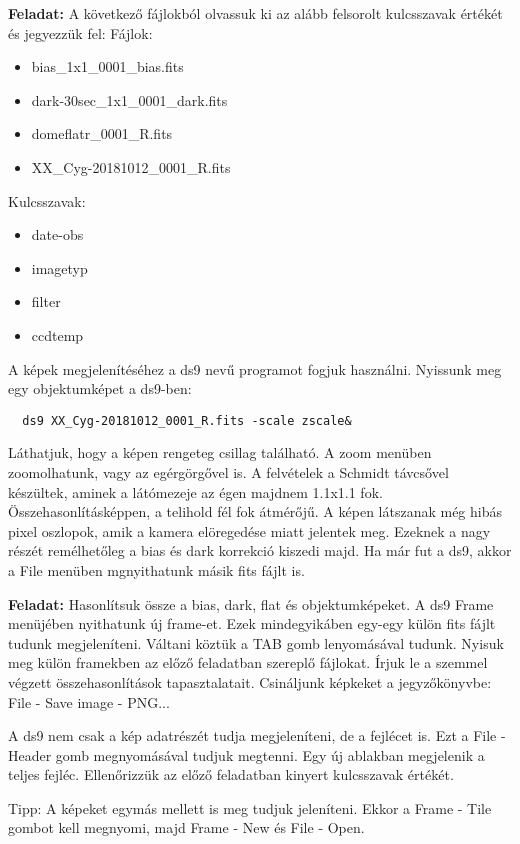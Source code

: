 \documentclass{article}
\begin{document}
{\bf Feladat:}
A következő fájlokból olvassuk ki az alább felsorolt kulcsszavak értékét és
jegyezzük fel:
Fájlok:
\begin{itemize}
  \item bias\_1x1\_0001\_bias.fits
  \item dark-30sec\_1x1\_0001\_dark.fits
  \item domeflatr\_0001\_R.fits
  \item XX\_Cyg-20181012\_0001\_R.fits
\end{itemize}
Kulcsszavak:
\begin{itemize}
  \item date-obs
  \item imagetyp
  \item filter
  \item ccdtemp
\end{itemize}


A képek megjelenítéséhez a ds9 nevű programot fogjuk használni.
Nyissunk meg egy objektumképet a ds9-ben:
\begin{verbatim}
  ds9 XX_Cyg-20181012_0001_R.fits -scale zscale&
\end{verbatim}

Láthatjuk, hogy a képen rengeteg csillag található. A zoom menüben zoomolhatunk,
vagy az egérgörgővel is. A felvételek a Schmidt távcsővel készültek, aminek a
látómezeje az égen majdnem 1.1x1.1 fok. Összehasonlításképpen, a telihold fél
fok átmérőjű.
A képen látszanak még hibás pixel oszlopok, amik a kamera elöregedése miatt
jelentek meg. Ezeknek a nagy részét remélhetőleg a bias és dark korrekció
kiszedi majd.
Ha már fut a ds9, akkor a File menüben mgnyithatunk másik fits fájlt is.

{\bf Feladat:}
Hasonlítsuk össze a bias, dark, flat és objektumképeket.
A ds9 Frame menüjében nyithatunk új frame-et. Ezek mindegyikáben egy-egy külön
fits fájlt tudunk megjeleníteni. Váltani köztük a TAB gomb lenyomásával tudunk.
Nyisuk meg külön framekben az előző feladatban szereplő fájlokat. Írjuk le a
szemmel végzett összehasonlítások tapasztalatait. Csináljunk képkeket a
jegyzőkönyvbe:
File - Save image - PNG...

A ds9 nem csak a kép adatrészét tudja megjeleníteni, de a fejlécet is. Ezt a
File - Header gomb megnyomásával tudjuk megtenni. Egy új ablakban megjelenik a
teljes fejléc. Ellenőrizzük az előző feladatban kinyert kulcsszavak értékét.

Tipp: A képeket egymás mellett is meg tudjuk jeleníteni. Ekkor a Frame - Tile
gombot kell megnyomi, majd Frame - New és File - Open.
\end{document}
